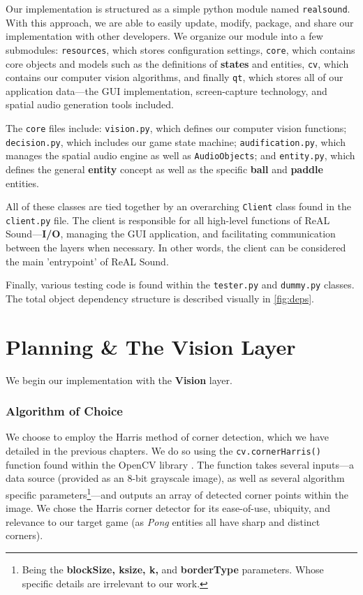 \documentclass{report}
\newcommand{\rs}{ReAL Sound\xspace}
\newcommand{\state}[1]{\textbf{#1}}
\newcommand{\vision}{\textbf{Vision}\xspace}
\newcommand{\pad}{\textbf{paddle}\xspace}
\newcommand{\ball}{\textbf{ball}\xspace}
\newcommand{\tech}[1]{\textbf{#1}}
\begin{document}
Our implementation is structured as a simple python module named \texttt{realsound}. With this approach, we are able to easily update, modify, package, and share our implementation with other developers. We organize our module into a few submodules: \texttt{resources}, which stores configuration settings, \texttt{core}, which contains core objects and models such as the definitions of \state{states} and entities, \texttt{cv}, which contains our computer vision algorithms, and finally \texttt{qt}, which stores all of our application data---the GUI implementation, screen-capture technology, and spatial audio generation tools included. 

The \texttt{core} files include: \texttt{vision.py}, which defines our computer vision functions; \texttt{decision.py}, which includes our game state machine; \texttt{audification.py}, which manages the spatial audio engine as well as \texttt{AudioObjects}; and \texttt{entity.py}, which defines the general \state{entity} concept as well as the specific \ball and \pad entities. 

All of these classes are tied together by an overarching \texttt{Client} class found in the \texttt{client.py} file. The client is responsible for all high-level functions of \rs---\textbf{I/O}, managing the GUI application, and facilitating communication between the layers when necessary. In other words, the client can be considered the main 'entrypoint' of \rs. 

Finally, various testing code is found within the \texttt{tester.py} and \texttt{dummy.py} classes. The total object dependency structure is described visually in \ref{fig:deps}.  

\subsubsection{}

\section{Planning \& The Vision Layer}

We begin our implementation with the \vision layer. 

\subsubsection{Algorithm of Choice}

We choose to employ the Harris method of corner detection, which we have detailed in the previous chapters. We do so using the \texttt{cv.cornerHarris()} function found within the OpenCV library \cite{OpenCV}. The function takes several inputs---a data source (provided as an 8-bit grayscale image), as well as several algorithm specific parameters\footnote{Being the \tech{blockSize, ksize, k, } and \tech{borderType} parameters. Whose specific details are irrelevant to our work.}---and outputs an array of detected corner points within the image. We chose the Harris corner detector for its ease-of-use, ubiquity, and relevance to our target game (as \emph{Pong} entities all have sharp and distinct corners).
\end{document}
